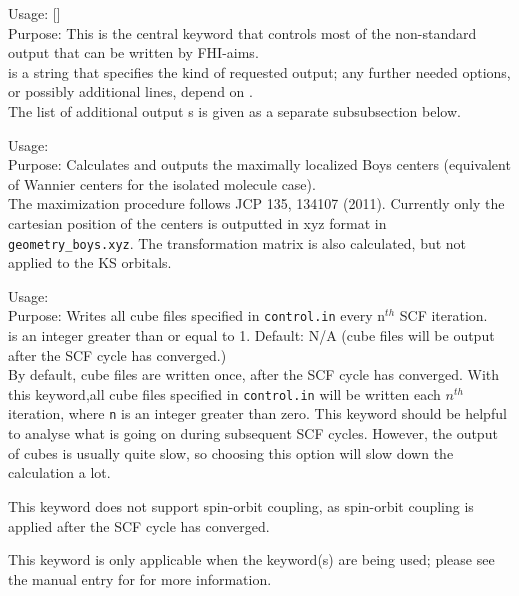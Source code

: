 {
  \noindent
  Usage:   []\\[1.0ex]
  Purpose: This is the central keyword that controls most of the
    non-standard output that can be written by FHI-aims. \\[1.0ex]
   is a string that specifies the kind of requested
    output; any further needed options, or possibly additional lines,
    depend on . \\
}
The list of additional output s is given as a separate
subsubsection below.

{
  \noindent
  Usage:  \\[1.0ex]
  Purpose: Calculates and outputs the maximally localized Boys centers
  (equivalent of Wannier centers for the isolated molecule case). \\
}
The maximization procedure follows JCP 135, 134107 (2011). Currently
only the cartesian position of the centers is outputted in xyz format in
\texttt{geometry\_boys.xyz}.  The transformation matrix is also calculated,
but not applied to the KS orbitals.

{
  \noindent
  Usage:   \\[1.0ex]
  Purpose: Writes all cube files specified in \texttt{control.in} every
   n$^{th}$ SCF iteration. \\[1.0ex]
   is an integer greater than or equal to 1.  Default: N/A (cube
   files will be output after the SCF cycle has converged.) \\
}
By default, cube files are written once, after the SCF cycle has converged.
With this keyword,all cube files specified in \texttt{control.in} will be
written each $n^{th}$ iteration, where \texttt{n} is an integer greater than
zero. This keyword should be helpful to analyse what is going on during
subsequent SCF cycles. However, the output of cubes is usually quite slow, so
choosing this option will slow down the calculation a lot.

This keyword does not support spin-orbit coupling, as spin-orbit coupling is
applied after the SCF cycle has converged.

This keyword is only applicable when the
  keyword(s) are being used; please see
the manual entry for   for more
information.

